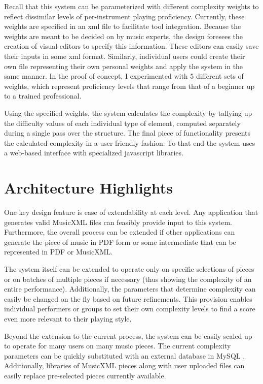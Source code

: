 \documentclass[12pt]{report}
\begin{document}
Recall that this system can be parameterized with different complexity weights to reflect dissimilar levels of per-instrument playing proficiency. Currently, these weights are specified in an xml file to facilitate tool integration. Because the weights are meant to be decided on by music experts, the design foresees the creation of visual editors to specify this information. These editors can easily save their inputs in some xml format. Similarly, individual users could create their own file representing their own personal weights and apply the system in the same manner. In the proof of concept, I experimented with 5 different sets of weights, which represent proficiency levels that range from that of a beginner up to a trained professional.

Using the specified weights, the system calculates the complexity by tallying up the difficulty values of each individual type of element, computed separately during a single pass over the structure. The final piece of functionality presents the calculated complexity in a user friendly fashion. To that end the system uses a web-based interface with specialized javascript libraries.

\section{Architecture Highlights} 
\label{sec:highlights}

One key design feature is ease of extendability at each level. Any application that generates valid MusicXML files can feasibly provide input to this system. Furthermore, the overall process can be extended if other applications can generate the piece of music in PDF form or some intermediate that can be represented in PDF or MusicXML.

The system itself can be extended to operate only on specific selections of pieces or on batches of multiple pieces if necessary (thus showing the complexity of an entire performance). Additionally, the parameters that determine complexity can easily be changed on the fly based on future refinements. This provision enables individual performers or groups to set their own complexity levels to find a score even more relevant to their playing style.

Beyond the extension to the current process, the system can be easily scaled up to operate for many users on many music pieces. The current complexity parameters can be quickly substituted with an external database in MySQL \cite{mysql}. Additionally, libraries of MusicXML pieces along with user uploaded files can easily replace pre-selected pieces currently available.
\end{document}
